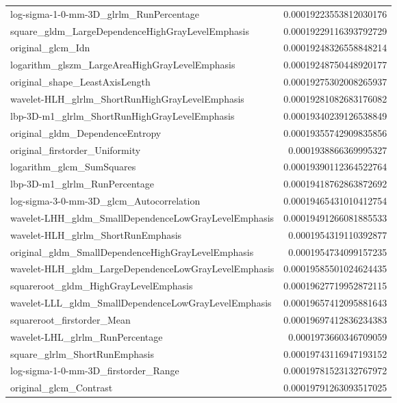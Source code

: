 {\begin{xltabular}[H]{\textwidth}{X r}
        log-sigma-1-0-mm-3D\_glrlm\_RunPercentage & 0.00019223553812030176 \\
        square\_gldm\_LargeDependenceHighGrayLevelEmphasis & 0.00019229116393792729 \\
        original\_glcm\_Idn & 0.00019248326558848214 \\
        logarithm\_glszm\_LargeAreaHighGrayLevelEmphasis & 0.00019248750448920177 \\
        original\_shape\_LeastAxisLength & 0.00019275302008265937 \\
        wavelet-HLH\_glrlm\_ShortRunHighGrayLevelEmphasis & 0.00019281082683176082 \\
        lbp-3D-m1\_glrlm\_ShortRunHighGrayLevelEmphasis & 0.00019340239126538849 \\
        original\_gldm\_DependenceEntropy & 0.00019355742909835856 \\
        original\_firstorder\_Uniformity & 0.0001938866369995327 \\
        logarithm\_glcm\_SumSquares & 0.00019390112364522764 \\
        lbp-3D-m1\_glrlm\_RunPercentage & 0.00019418762863872692 \\
        log-sigma-3-0-mm-3D\_glcm\_Autocorrelation & 0.00019465431010412754 \\
        wavelet-LHH\_gldm\_SmallDependenceLowGrayLevelEmphasis & 0.00019491266081885533 \\
        wavelet-HLH\_glrlm\_ShortRunEmphasis & 0.0001954319110392877 \\
        original\_gldm\_SmallDependenceHighGrayLevelEmphasis & 0.0001954734099157235 \\
        wavelet-HLH\_gldm\_LargeDependenceLowGrayLevelEmphasis & 0.00019585501024624435 \\
        squareroot\_gldm\_HighGrayLevelEmphasis & 0.00019627719952872115 \\
        wavelet-LLL\_gldm\_SmallDependenceLowGrayLevelEmphasis & 0.00019657412095881643 \\
        squareroot\_firstorder\_Mean & 0.00019697412836234383 \\
        wavelet-LHL\_glrlm\_RunPercentage & 0.0001973660346709059 \\
        square\_glrlm\_ShortRunEmphasis & 0.00019743116947193152 \\
        log-sigma-1-0-mm-3D\_firstorder\_Range & 0.00019781523132767972 \\
        original\_glcm\_Contrast & 0.00019791263093517025 \\

\end{xltabular}}
